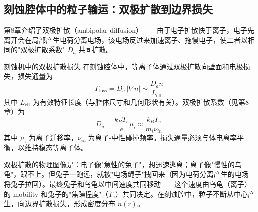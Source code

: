 \documentclass[12pt,a4paper,openany,oneside]{book}
\begin{document}
\subsection{刻蚀腔体中的粒子输运：双极扩散到边界损失}

第8章介绍了双极扩散（ambipolar diffusion）——由于电子扩散快于离子，电子先离开会在局部产生电荷分离电场，该电场反过来加速离子、拖慢电子，使二者以相同的"双极扩散系数" $D_a$ 共同扩散。

\begin{theorem}{刻蚀机中的双极扩散损失}{}{}
\label{thm:ambipolar-etcher}
在刻蚀腔体中，等离子体通过双极扩散向壁面和电极损失，损失通量为
\begin{equation}
\label{eq:ambipolar-loss}
\Gamma_{\text{loss}} = D_a \,|\nabla n| \sim \frac{D_a n}{L_{\text{eff}}}
\end{equation}
其中 $L_{\text{eff}}$ 为有效特征长度（与腔体尺寸和几何形状有关）。双极扩散系数（见第8章）为
\begin{equation}
D_a = \frac{k_B T_e}{e} \mu_i \approx \frac{k_B T_e}{m_i \nu_{in}}
\end{equation}
其中 $\mu_i$ 为离子迁移率，$\nu_{in}$ 为离子-中性碰撞频率。损失通量必须与体电离率平衡，以维持稳态等离子体。
\end{theorem}

\begin{insight}{}{}
双极扩散的物理图像是：电子像"急性的兔子"，想迅速逃离；离子像"慢性的乌龟"，跟不上。但兔子一跑远，就被"电场绳子"拽回来（因为电荷分离产生的电场将兔子拉回）。最终兔子和乌龟以中间速度共同移动——这个速度由乌龟（离子）的 mobility 和兔子的"焦躁程度"（$T_e$）共同决定。在刻蚀腔中，粒子不断从中心产生，向边界扩散损失，形成密度分布 $n(r)$。
\end{insight}
\end{document}
